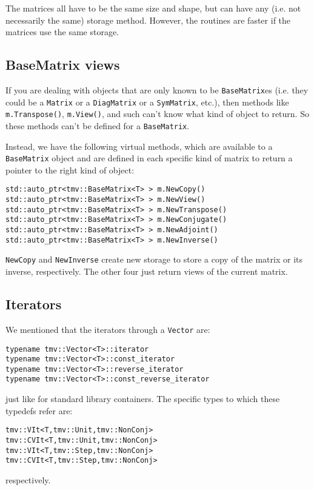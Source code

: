 \documentclass[twoside,letterpaper,11pt]{article}
\renewcommand{\tt}[1]{{\texttt {#1}}}
\begin{document}
The matrices all have to be the same size and shape, but can have any 
(i.e. not necessarily the same) storage method.  However, the routines are faster
if the matrices use the same storage.

\subsection{BaseMatrix views}

If you are dealing with objects that are only known to be \tt{BaseMatrix}es
(i.e. they could be a \tt{Matrix} or a \tt{DiagMatrix} or a \tt{SymMatrix}, etc.),
then methods like \tt{m.Transpose()}, \tt{m.View()}, and such
can't know what kind of object to return.
So these methods can't be defined for a \tt{BaseMatrix}.  

Instead, we have the following virtual methods, 
which are available to a \tt{BaseMatrix}
object and are defined in each specific kind of matrix to return a pointer
to the right kind of object:
\begin{verbatim}
std::auto_ptr<tmv::BaseMatrix<T> > m.NewCopy()
std::auto_ptr<tmv::BaseMatrix<T> > m.NewView()
std::auto_ptr<tmv::BaseMatrix<T> > m.NewTranspose()
std::auto_ptr<tmv::BaseMatrix<T> > m.NewConjugate()
std::auto_ptr<tmv::BaseMatrix<T> > m.NewAdjoint()
std::auto_ptr<tmv::BaseMatrix<T> > m.NewInverse()
\end{verbatim}
\tt{NewCopy} and \tt{NewInverse} create new storage to store a copy of the 
matrix or its inverse, respectively.  The other four just return views of the current 
matrix.

\subsection{Iterators}

We mentioned that the iterators through a \tt{Vector} are:
\begin{verbatim}
typename tmv::Vector<T>::iterator
typename tmv::Vector<T>::const_iterator
typename tmv::Vector<T>::reverse_iterator
typename tmv::Vector<T>::const_reverse_iterator
\end{verbatim}
just like for standard library containers.  The specific types to which these
typedefs refer are:
\begin{verbatim}
tmv::VIt<T,tmv::Unit,tmv::NonConj>
tmv::CVIt<T,tmv::Unit,tmv::NonConj>
tmv::VIt<T,tmv::Step,tmv::NonConj>
tmv::CVIt<T,tmv::Step,tmv::NonConj>
\end{verbatim}
respectively.
\end{document}
